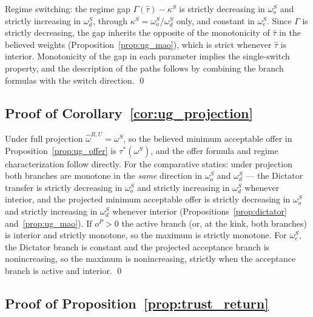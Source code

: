 \documentclass[11pt]{article}
\theoremstyle{plain}
\theoremstyle{remark}
\begin{document}
Regime switching: the regime gap $\Gamma(\hat\tau)-\kappa^S$ is strictly decreasing in $\omega_o^S$ and strictly increasing in $\omega_d^S$, through $\kappa^S=\omega_o^S/\omega_d^S$ only, and constant in $\omega_e^S$.  Since $\Gamma$ is strictly decreasing, the gap inherits the opposite of the monotonicity of $\hat\tau$ in the believed weights (Proposition~\ref{prop:ug_mao}), which is strict whenever $\hat\tau$ is interior.  Monotonicity of the gap in each parameter implies the single-switch property, and the description of the paths follows by combining the branch formulas with the switch direction.
\qed

\subsection*{Proof of Corollary~\ref{cor:ug_projection}}

Under full projection $\hat\omega^{R,U}=\omega^S$, so the believed minimum acceptable offer in Proposition~\ref{prop:ug_offer} is $\tau^\ast(\omega^S)$, and the offer formula and regime characterization follow directly.  For the comparative statics: under projection both branches are monotone in the \emph{same} direction in $\omega_o^S$ and $\omega_d^S$ --- the Dictator transfer is strictly decreasing in $\omega_o^S$ and strictly increasing in $\omega_d^S$ whenever interior, and the projected minimum acceptable offer is strictly decreasing in $\omega_o^S$ and strictly increasing in $\omega_d^S$ whenever interior (Propositions~\ref{prop:dictator} and~\ref{prop:ug_mao}).  If $o^P>0$ the active branch (or, at the kink, both branches) is interior and strictly monotone, so the maximum is strictly monotone.  For $\omega_e^S$, the Dictator branch is constant and the projected acceptance branch is nonincreasing, so the maximum is nonincreasing, strictly when the acceptance branch is active and interior.
\qed

\subsection*{Proof of Proposition~\ref{prop:trust_return}}
\end{document}
